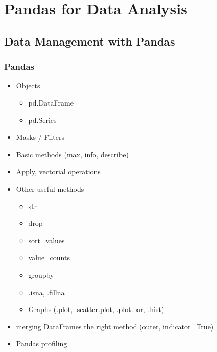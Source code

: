 



\begin{frame}
   \titlepage
\end{frame}



\begin{frame}
   \tableofcontents
\end{frame}

\section{Pandas for Data Analysis}

\subsection{Data Management with Pandas}

\begin{frame}\frametitle{Pandas}
   \begin{itemize}
      \item Objects
      \begin{itemize}
         \item pd.DataFrame
         \item pd.Series
      \end{itemize}
      \item Masks / Filters
      \item Basic methods (max, info, describe)
      \item Apply, vectorial operations
      \item Other useful methods
      \begin{itemize}
         \item str
         \item drop
         \item sort\_values
         \item value\_counts
         \item groupby
         \item .isna, .fillna
         \item Graphs (.plot, .scatter.plot, .plot.bar, .hist)
      \end{itemize}
      \item merging DataFrames the right method (outer, indicator=True)
      \item Pandas profiling
   \end{itemize}
\end{frame}




